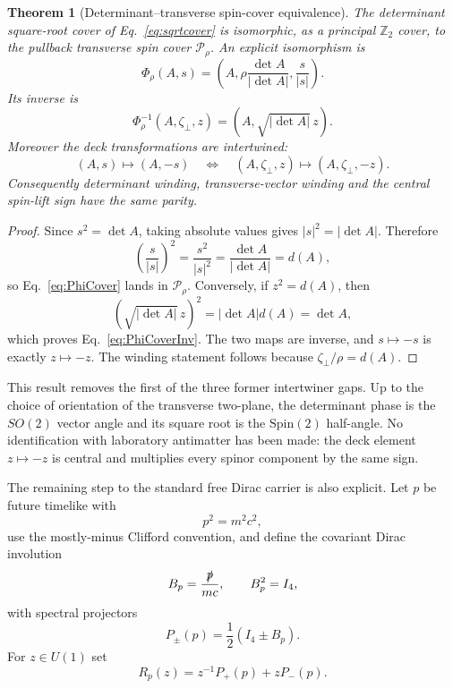 \documentclass[11pt]{article}
\newtheorem{theorem}{Theorem}[section]
\theoremstyle{definition}\newtheorem{definition}[theorem]{Definition}
\theoremstyle{remark}\newtheorem{remark}[theorem]{Remark}\newtheorem{conjecture}[theorem]{Conjecture}
\begin{document}
\begin{theorem}[Determinant--transverse spin-cover equivalence]\label{thm:detspincover}
The determinant square-root cover of Eq.~\eqref{eq:sqrtcover} is isomorphic, as a principal $\mathbb Z_2$ cover, to the pullback transverse spin cover $\mathcal P_\rho$. An explicit isomorphism is
\begin{equation}\label{eq:PhiCover}
 \boxed{
 \Phi_\rho(A,s)=
 \left(A,\rho\frac{\det A}{|\det A|},\frac{s}{|s|}\right).}
\end{equation}
Its inverse is
\begin{equation}\label{eq:PhiCoverInv}
 \boxed{
 \Phi_\rho^{-1}(A,\zeta_\perp,z)=
 \left(A,\sqrt{|\det A|}\,z\right).}
\end{equation}
Moreover the deck transformations are intertwined:
\begin{equation}
 (A,s)\mapsto(A,-s)
 \quad\Longleftrightarrow\quad
 (A,\zeta_\perp,z)\mapsto(A,\zeta_\perp,-z).
\end{equation}
Consequently determinant winding, transverse-vector winding and the central spin-lift sign have the same parity.
\end{theorem}
\begin{proof}
Since $s^2=\det A$, taking absolute values gives $|s|^2=|\det A|$. Therefore
\begin{equation}
 \left(\frac{s}{|s|}\right)^2
 =\frac{s^2}{|s|^2}
 =\frac{\det A}{|\det A|}
 =d(A),
\end{equation}
so Eq.~\eqref{eq:PhiCover} lands in $\mathcal P_\rho$. Conversely, if $z^2=d(A)$, then
\begin{equation}
 \left(\sqrt{|\det A|}\,z\right)^2
 =|\det A|d(A)=\det A,
\end{equation}
which proves Eq.~\eqref{eq:PhiCoverInv}. The two maps are inverse, and $s\mapsto-s$ is exactly $z\mapsto-z$. The winding statement follows because $\zeta_\perp/\rho=d(A)$.
\end{proof}

This result removes the first of the three former intertwiner gaps. Up to the choice of orientation of the transverse two-plane, the determinant phase is the $SO(2)$ vector angle and its square root is the $\mathrm{Spin}(2)$ half-angle. No identification with laboratory antimatter has been made: the deck element $z\mapsto-z$ is central and multiplies every spinor component by the same sign.

The remaining step to the standard free Dirac carrier is also explicit. Let $p$ be future timelike with
\begin{equation}
 p^2=m^2c^2,
\end{equation}
use the mostly-minus Clifford convention, and define the covariant Dirac involution
\begin{equation}\label{eq:Bp}
 B_p=\frac{\slashed p}{mc},\qquad B_p^2=I_4,
\end{equation}
with spectral projectors
\begin{equation}\label{eq:PpmDirac}
 P_\pm(p)=\frac12(I_4\pm B_p).
\end{equation}
For $z\in U(1)$ set
\begin{equation}\label{eq:DiracSpin2rep}
 \boxed{
 R_p(z)=z^{-1}P_+(p)+zP_-(p).}
\end{equation}
\end{document}

